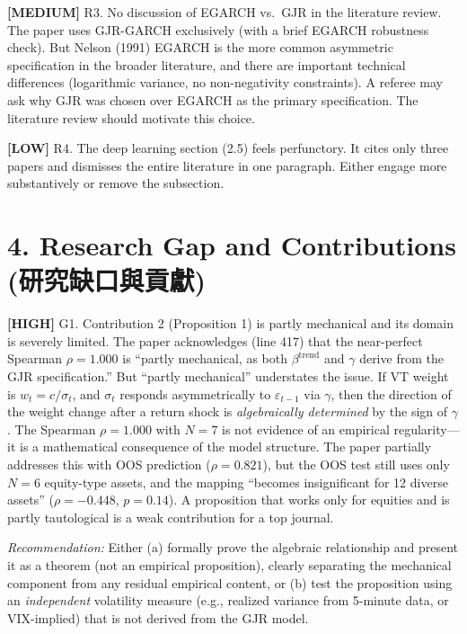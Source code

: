 \documentclass[12pt,a4paper]{article}
\newcommand{\high}[1]{\textcolor{errorred}{\textbf{[HIGH]} #1}}
\newcommand{\med}[1]{\textcolor{warncolor}{\textbf{[MEDIUM]} #1}}
\newcommand{\low}[1]{\textcolor{okgreen}{\textbf{[LOW]} #1}}
\begin{document}
\med{R3. No discussion of EGARCH vs.\ GJR in the literature review.} The paper uses GJR-GARCH exclusively (with a brief EGARCH robustness check). But Nelson (1991) EGARCH is the more common asymmetric specification in the broader literature, and there are important technical differences (logarithmic variance, no non-negativity constraints). A referee may ask why GJR was chosen over EGARCH as the primary specification. The literature review should motivate this choice.

\low{R4. The deep learning section (2.5) feels perfunctory.} It cites only three papers and dismisses the entire literature in one paragraph. Either engage more substantively or remove the subsection.


\section*{4. Research Gap and Contributions (研究缺口與貢獻)}

\high{G1. Contribution 2 (Proposition 1) is partly mechanical and its domain is severely limited.} The paper acknowledges (line 417) that the near-perfect Spearman $\rho = 1.000$ is ``partly mechanical, as both $\beta^{\text{trend}}$ and $\gamma$ derive from the GJR specification.'' But ``partly mechanical'' understates the issue. If VT weight is $w_t = c / \sigma_t$, and $\sigma_t$ responds asymmetrically to $\varepsilon_{t-1}$ via $\gamma$, then the direction of the weight change after a return shock is \emph{algebraically determined} by the sign of $\gamma$. The Spearman $\rho = 1.000$ with $N = 7$ is not evidence of an empirical regularity---it is a mathematical consequence of the model structure. The paper partially addresses this with OOS prediction ($\rho = 0.821$), but the OOS test still uses only $N = 6$ equity-type assets, and the mapping ``becomes insignificant for 12 diverse assets'' ($\rho = -0.448$, $p = 0.14$). A proposition that works only for equities and is partly tautological is a weak contribution for a top journal.

\emph{Recommendation:} Either (a) formally prove the algebraic relationship and present it as a theorem (not an empirical proposition), clearly separating the mechanical component from any residual empirical content, or (b) test the proposition using an \emph{independent} volatility measure (e.g., realized variance from 5-minute data, or VIX-implied) that is not derived from the GJR model.
\end{document}
